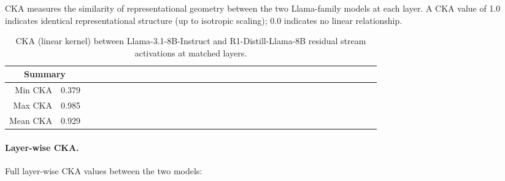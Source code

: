 \documentclass[accepted]{article}
\begin{document}
CKA \citep{kornblith2019similarity} measures the similarity of
representational geometry between the two Llama-family models at each
layer.  A CKA value of 1.0 indicates identical representational
structure (up to isotropic scaling); 0.0 indicates no linear
relationship.

\begin{table}[ht]
\centering
\caption{CKA (linear kernel) between Llama-3.1-8B-Instruct and
  R1-Distill-Llama-8B residual stream activations at matched layers.}
\label{tab:cka}
\vspace{4pt}
\small
\begin{tabular}{rcrcrcrcrcrcrcrcrcrcrcrcrcrcrcrcrcrr}
\toprule
\multicolumn{2}{c}{\textbf{Summary}} \\
\midrule
Min CKA & 0.379 \\
Max CKA & 0.985 \\
Mean CKA & 0.929 \\
\bottomrule
\end{tabular}
\end{table}

\paragraph{Layer-wise CKA.}
Full layer-wise CKA values between the two models:
\end{document}
